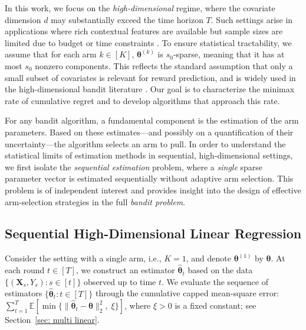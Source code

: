 \documentclass[aos,preprint]{imsart}
\theoremstyle{plain}
\theoremstyle{definition}
\newcommand{\btheta}{\boldsymbol{\theta}}
\newcommand{\bX}{\boldsymbol{X}}
\begin{document}
In this work, we focus on the \emph{high-dimensional} regime, where the covariate dimension $d$ may substantially exceed the time horizon $T$. Such settings arise in applications where rich contextual features are available but sample sizes are limited due to budget or time constraints \cite{bastani2020online,lattimore2020bandit}. To ensure statistical tractability, we assume that for each arm $k \in [K]$,  $\btheta^{(k)}$ is $s_0$-sparse, meaning that it has at most $s_0$ nonzero components. This reflects the standard assumption that only a small subset of covariates is relevant for reward prediction, and is widely used in the high-dimensional bandit literature \cite{bastani2020online,hao2020high,oh2021sparsity,ren2024dynamic}. Our goal is to characterize the minimax rate of cumulative regret and to develop algorithms that approach this rate.
 
For any bandit algorithm, a fundamental component is the estimation of the arm parameters. Based on these estimates---and possibly on a quantification of their uncertainty---the algorithm selects an arm to pull. In order to understand the statistical limits of estimation methods in sequential, high-dimensional settings,
we first isolate the \textit{sequential estimation} problem, where a \textit{single} sparse parameter vector is estimated sequentially without adaptive arm selection.   This problem is of independent interest and provides insight into the design of effective arm-selection strategies in the full \textit{bandit problem}.


\subsection{Sequential High-Dimensional Linear Regression}\label{sec: sequential estimation}
Consider the setting with a single arm, i.e., $K = 1$, and denote $\btheta^{(1)}$ by $\btheta$. At each round $t \in [T]$, we construct an estimator $\hat{\btheta}_t$ based on the data $\{(\bX_s, Y_s): s \in [t]\}$ observed up to time $t$. We evaluate the sequence of estimators $\{\hat{\btheta}_t: t \in [T]\}$ through the cumulative capped mean-square error:
$\sum_{t=1}^{T} \mathbb{E}[\min\{ \| \hat{\btheta}_t - \btheta \|_2^2, \; \xi \} ]$,
where $\xi > 0$ is a fixed constant;  see Section~\ref{sec: multi linear}.
\end{document}
